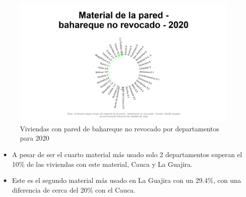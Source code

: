     \begin{figure}[H]
        \caption{Viviendas con pared de bahareque no revocado por departamentos para 2020 \label{map_result_2} }
        \begin{center}
        \includegraphics[width=\textwidth,keepaspectratio]{img/var_152_static.png}
        \end{center}
    \end{figure}
            \begin{itemize}
                    \item A pesar de ser el cuarto material más usado solo 2 departamentos superan el 10\% de las viviendas con este material, Cauca y La Guajira.
                    \item Este es el segundo material más usado en La Guajira con un 29.4\%, con una diferencia de cerca del 20\% con el Cauca.
                    \end{itemize}

